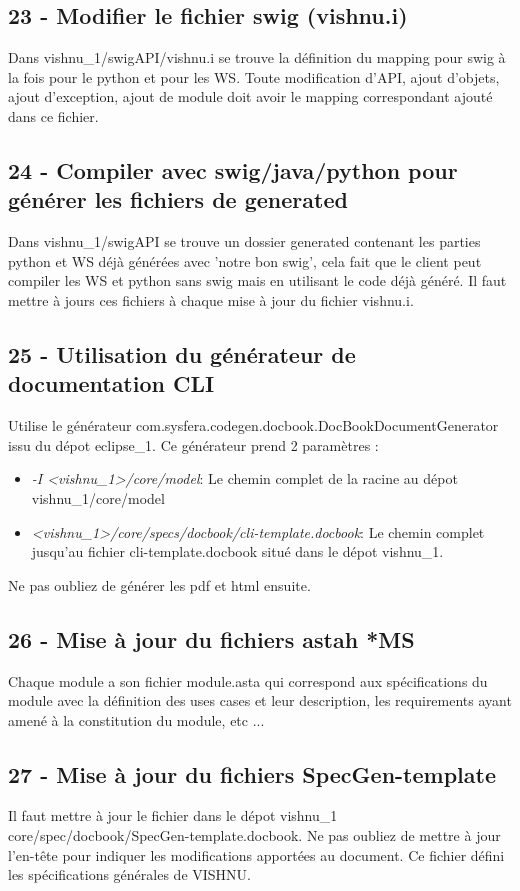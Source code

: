 \documentclass{article}
\begin{document}
\subsection{23 - Modifier le fichier swig (vishnu.i)}
Dans vishnu\_1/swigAPI/vishnu.i se trouve la définition du mapping pour swig
à la fois pour le python et pour les WS. Toute modification d'API, ajout 
d'objets, ajout d'exception, ajout de module doit avoir le mapping
correspondant ajouté dans ce fichier.

\subsection{24 - Compiler avec swig/java/python pour générer les fichiers de generated}
Dans vishnu\_1/swigAPI se trouve un dossier generated contenant les parties 
python et WS déjà générées avec 'notre bon swig', cela fait que le client
peut compiler les WS et python sans swig mais en utilisant le code déjà 
généré. Il faut mettre à jours ces fichiers à chaque mise à jour du fichier
vishnu.i.

\subsection{25 - Utilisation du générateur de documentation CLI}
Utilise le générateur com.sysfera.codegen.docbook.DocBookDocumentGenerator
issu du dépot eclipse\_1. Ce générateur prend 2 paramètres :
\begin{itemize}
\item \textit{-I <vishnu\_1>/core/model}: Le chemin complet de la racine au dépot 
vishnu\_1/core/model
\item \textit{<vishnu\_1>/core/specs/docbook/cli-template.docbook}: Le chemin
complet jusqu'au fichier cli-template.docbook situé dans le dépot vishnu\_1.
\end{itemize}
Ne pas oubliez de générer les pdf et html ensuite.

\subsection{26 - Mise à jour du fichiers astah *MS}
Chaque module a son fichier module.asta qui correspond aux spécifications du 
module avec la définition des uses cases et leur description, les requirements
ayant amené à la constitution du module, etc ...

\subsection{27 - Mise à jour du fichiers SpecGen-template}
Il faut mettre à jour le fichier dans le dépot vishnu\_1
core/spec/docbook/SpecGen-template.docbook. Ne pas oubliez
de mettre à jour l'en-tête pour indiquer les modifications apportées
au document. Ce fichier défini les spécifications générales de VISHNU.
\end{document}
